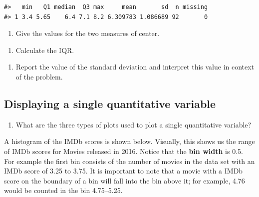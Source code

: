 \documentclass[
]{report}
\providecommand{\tightlist}{%
  \setlength{\itemsep}{0pt}\setlength{\parskip}{0pt}}
\begin{document}
\begin{verbatim}
#>   min   Q1 median  Q3 max     mean       sd  n missing
#> 1 3.4 5.65    6.4 7.1 8.2 6.309783 1.086689 92       0
\end{verbatim}

\begin{enumerate}
\def\labelenumi{\arabic{enumi}.}
\setcounter{enumi}{3}
\tightlist
\item
  Give the values for the two measures of center.
\end{enumerate}

\vspace{0.5in}

\begin{enumerate}
\def\labelenumi{\arabic{enumi}.}
\setcounter{enumi}{4}
\tightlist
\item
  Calculate the IQR.
\end{enumerate}

\vspace{0.5in}

\begin{enumerate}
\def\labelenumi{\arabic{enumi}.}
\setcounter{enumi}{5}
\tightlist
\item
  Report the value of the standard deviation and interpret this value in context of the problem.
  \vspace{1in}
\end{enumerate}

\hypertarget{displaying-a-single-quantitative-variable}{%
\subsection*{Displaying a single quantitative variable}\label{displaying-a-single-quantitative-variable}}

\begin{enumerate}
\def\labelenumi{\arabic{enumi}.}
\setcounter{enumi}{6}
\tightlist
\item
  What are the three types of plots used to plot a single quantitative variable?
\end{enumerate}

\newpage

A histogram of the IMDb scores is shown below. Visually, this shows us the range of IMDb scores for Movies released in 2016.
Notice that the \textbf{bin width} is 0.5. For example the first bin consists of the number of movies in the data set with an IMDb score of 3.25 to 3.75. It is important to note that a movie with a IMDb score on the boundary of a bin will fall into the bin above it; for example, 4.76 would be counted in the bin 4.75--5.25.
\end{document}
